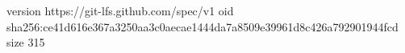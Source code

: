 version https://git-lfs.github.com/spec/v1
oid sha256:ce41d616e367a3250aa3c0aecae1444da7a8509e39961d8c426a792901944fcd
size 315

